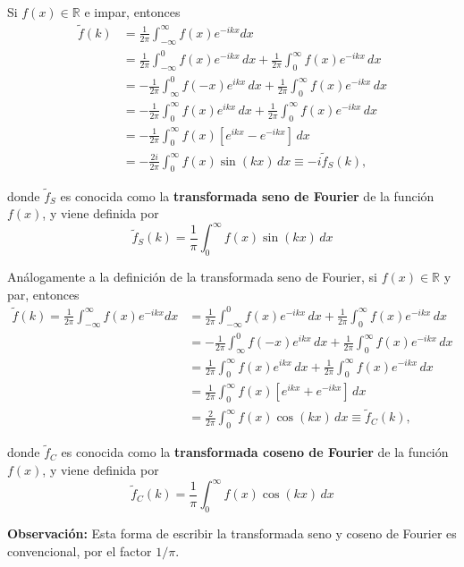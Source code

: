 \begin{ejemplo}[Paridad]
Si $f(x) \in \mathbb{R}$ e impar, entonces
\begin{align*}
     \tilde{f}(k) &= \frac{1}{2\pi} \int_{-\infty}^{\infty} f(x) e^{-ikx} dx \\
&= \frac{1}{2\pi} \int_{-\infty}^0 f(x) e^{-ikx} \,dx + \frac{1}{2\pi} \int_{0}^{\infty} f(x) e^{-ikx} \, dx  \\
 &= -\frac{1}{2\pi} \int_{\infty}^0 f(-x) e^{ikx} \,dx + \frac{1}{2\pi} \int_{0}^{\infty} f(x) e^{-ikx} \, dx \\
     &= -\frac{1}{2\pi} \int_{0}^{\infty} f(x) e^{ikx} \,dx + \frac{1}{2\pi} \int_{0}^{\infty} f(x) e^{-ikx} \, dx  \\
      &= -\frac{1}{2\pi} \int_{0}^{\infty} f(x) [e^{ikx} - e^{-ikx}  ] \,dx \\
     &= -\frac{2i}{2\pi} \int_{0}^{\infty} f(x) \sin(kx) \,dx \equiv - i  \tilde{f}_S(k),
     \end{align*}
     
     donde $\tilde{f}_S$ es conocida como la \textbf{transformada seno de Fourier} de la función $f(x)$, y viene definida por \cite{Mauch} 
     $$\boxed{\tilde{f}_S(k) = \frac{1}{\pi}  \int_{0}^{\infty} f(x) \sin(kx) \,dx}$$
     
Análogamente a la definición de la  transformada seno de Fourier, si $f(x) \in \mathbb{R}$ y par, entonces 
\begin{align*}
     \tilde{f}(k) = \frac{1}{2\pi} \int_{-\infty}^{\infty} f(x) e^{-ikx} dx &= \frac{1}{2\pi} \int_{-\infty}^0 f(x) e^{-ikx} \,dx + \frac{1}{2\pi} \int_{0}^{\infty} f(x) e^{-ikx} \, dx  \\
     &= -\frac{1}{2\pi} \int_{\infty}^0 f(-x) e^{ikx} \,dx + \frac{1}{2\pi} \int_{0}^{\infty} f(x) e^{-ikx} \, dx \\
     &= \frac{1}{2\pi} \int_{0}^{\infty} f(x) e^{ikx} \,dx + \frac{1}{2\pi} \int_{0}^{\infty} f(x) e^{-ikx} \, dx \\
     &= \frac{1}{2\pi} \int_{0}^{\infty} f(x) [e^{ikx} + e^{-ikx}  ] \,dx \\
     &= \frac{2}{2\pi} \int_{0}^{\infty} f(x) \cos(kx) \,dx \equiv  \tilde{f}_C(k),
     \end{align*}
     
donde $\tilde{f}_C$ es conocida como la \textbf{transformada coseno de Fourier} de la función $f(x)$, y viene definida por \cite{Mauch}
     $$\boxed{\tilde{f}_C(k) = \frac{1}{\pi}  \int_{0}^{\infty} f(x) \cos(kx) \,dx}$$

\textbf{Observación: } Esta forma de escribir la transformada seno y coseno de Fourier es convencional, por el factor $1/\pi$.
\end{ejemplo}


